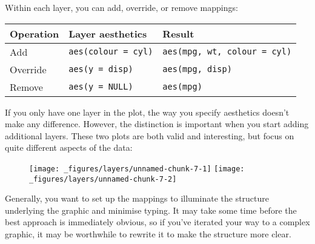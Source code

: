 Within each layer, you can add, override, or remove mappings:

\begin{longtable}[c]{@{}lll@{}}
\toprule
Operation & Layer aesthetics & Result\tabularnewline
\midrule
\endhead
Add & \texttt{aes(colour\ =\ cyl)} &
\texttt{aes(mpg,\ wt,\ colour\ =\ cyl)}\tabularnewline
Override & \texttt{aes(y\ =\ disp)} &
\texttt{aes(mpg,\ disp)}\tabularnewline
Remove & \texttt{aes(y\ =\ NULL)} & \texttt{aes(mpg)}\tabularnewline
\bottomrule
\end{longtable}

If you only have one layer in the plot, the way you specify aesthetics
doesn't make any difference. However, the distinction is important when
you start adding additional layers. These two plots are both valid and
interesting, but focus on quite different aspects of the data:

\begin{Shaded}
\begin{Highlighting}[]
 \StringTok{ }
\StringTok{  }\NormalTok{() +}\StringTok{ }
\StringTok{  }\NormalTok{(} \NormalTok{, } \NormalTok{) +}
\StringTok{  }\NormalTok{(} \NormalTok{)}

\StringTok{ }
\StringTok{  }\NormalTok{(}\NormalTok{(} \StringTok{ }
\StringTok{  }\NormalTok{(} \NormalTok{, } \NormalTok{) +}\StringTok{ }
\StringTok{  }\NormalTok{(} \NormalTok{)}
\end{Highlighting}
\end{Shaded}

\begin{figure}[H]
  \texttt{[image: \_figures/layers/unnamed-chunk-7-1]}%
  \texttt{[image: \_figures/layers/unnamed-chunk-7-2]}
\end{figure}

Generally, you want to set up the mappings to illuminate the structure
underlying the graphic and minimise typing. It may take some time before
the best approach is immediately obvious, so if you've iterated your way
to a complex graphic, it may be worthwhile to rewrite it to make the
structure more clear.

